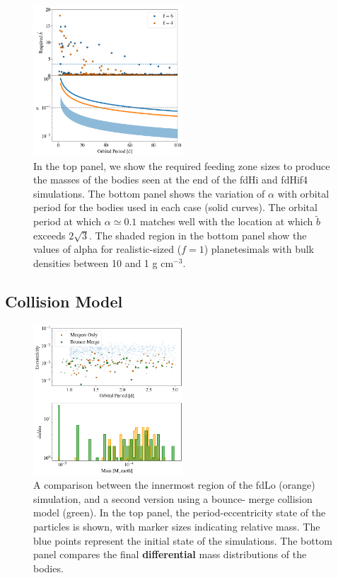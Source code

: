 \documentclass[twocolumn,linenumbers]{aastex63}
\begin{document}
\begin{figure}
\begin{center}
    \includegraphics[width=0.5\textwidth]{figures/f6f4_b.png}
    \caption{In the top panel, we show the required feeding zone sizes to produce the masses of the bodies seen
    at the end of the fdHi and fdHif4 simulations.  The bottom panel shows the variation of $\alpha$ with orbital period for the 
    bodies used in each case (solid curves). The orbital period at which $\alpha \simeq 0.1$ matches well with the location at 
    which $\tilde{b}$ exceeds $2 \sqrt{3}$. The shaded region
    in the bottom panel show the values of alpha for realistic-sized ($f=1$) planetesimals with bulk densities between 10 and 1 g cm$^{-3}$.\label{fig:f6f4_b}}
\end{center}
\end{figure}

\subsection{Collision Model}

\begin{figure}
\begin{center}
    \includegraphics[width=0.5\textwidth]{figures/frag_ecc.png}
    \caption{A comparison between the innermost region of the fdLo (orange) simulation, and a second version using a bounce-
    merge collision model (green). In the top panel, the period-eccentricity state of the particles is shown, with marker sizes 
    indicating relative mass. The blue points represent the initial state of the simulations. The bottom panel compares the final 
    \textbf{differential} mass distributions of the bodies. \label{fig:frag_ecc}}
\end{center}
\end{figure}
\end{document}
